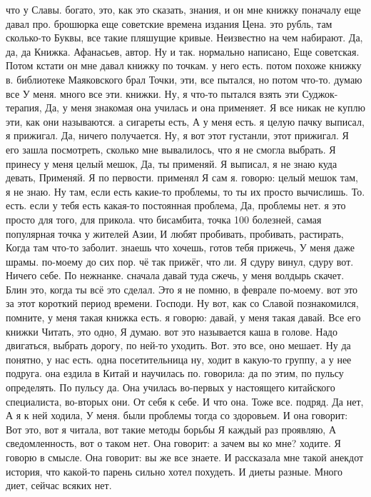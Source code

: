 что у Славы.
богато, это, как это сказать, знания, и он мне книжку поначалу еще давал про.
брошюрка еще советские времена издания Цена.
это рубль, там сколько-то Буквы, все такие пляшущие кривые.
Неизвестно на чем набирают.
Да, да, да Книжка.
Афанасьев, автор. Ну и так.
нормально написано, Еще советская. Потом кстати он мне давал книжку по точкам. у него есть.
потом похоже книжку в.
библиотеке Маяковского брал Точки, эти, все пытался, но потом что-то.
думаю все У меня.
много все эти.
книжки. Ну, я что-то пытался взять эти Суджок-терапия, Да, у меня знакомая она училась и она применяет. Я все никак не куплю эти, как они называются.
а сигареты есть, А у меня есть. я целую пачку выписал, я прижигал.
Да, ничего получается. Ну, я вот этот густанли, этот прижигал. Я его зашла посмотреть, сколько мне вывалилось, что я не смогла выбрать. Я принесу у меня целый мешок, Да, ты применяй. Я выписал, я не знаю куда девать, Применяй.
Я по первости.
применял Я сам я.
говорю: целый мешок там, я не знаю.
Ну там, если есть какие-то проблемы, то ты их просто вычислишь. То.
есть. если у тебя есть какая-то постоянная проблема, Да, проблемы нет. я это просто для того, для прикола.
что бисамбита, точка 100 болезней, самая популярная точка у жителей Азии, И любят пробивать, пробивать, растирать, Когда там что-то заболит. знаешь что хочешь, готов тебя прижечь, У меня даже шрамы.
по-моему до сих пор.
чё так прижёг, что ли.
Я сдуру винул, сдуру вот.
Ничего себе.
По нежнанке. сначала давай туда сжечь, у меня волдырь скачет.
Блин это, когда ты всё это сделал.
Это я не помню, в феврале по-моему.
вот это за этот короткий период времени.
Господи.
Ну вот, как со Славой познакомился, помните, у меня такая книжка есть. я говорю: давай, у меня такая давай.
Все его книжки Читать, это одно, Я думаю. вот это называется каша в голове. Надо двигаться, выбрать дорогу, по ней-то уходить. Вот.
это все, оно мешает. Ну да понятно, у нас есть.
одна посетительница ну, ходит в какую-то группу, а у нее подруга. она ездила в Китай и научилась по.
говорила: да по этим, по пульсу определять.
По пульсу да.
Она училась во-первых у настоящего китайского специалиста, во-вторых они.
От себя к себе.
И что она.
Тоже все.
подряд. Да нет, А я к ней ходила, У меня.
были проблемы тогда со здоровьем. И она говорит: Вот это, вот я читала, вот такие методы борьбы Я каждый раз проявляю, А сведомленность, вот о таком нет.
Она говорит: а зачем вы ко мне?
ходите.
Я говорю в смысле.
Она говорит: вы же все знаете.
И рассказала мне такой анекдот история, что какой-то парень сильно хотел похудеть.
И диеты разные.
Много диет, сейчас всяких нет.
